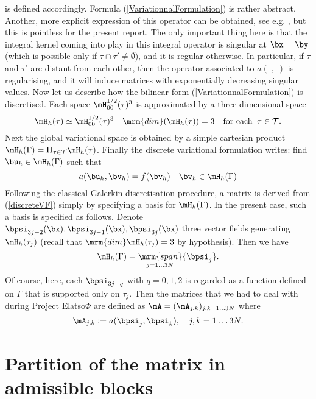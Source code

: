 is defined accordingly. Formula  (\ref{VariationnalFormulation}) is rather abstract. Another, more explicit expression of this operator can be obtained, 
see e.g. \cite{??}, but this is pointless for the present report. The only important thing here is that the integral kernel coming into play in this integral 
operator is singular at $\bx = \by$ (which is possible only if $\tau\cap \tau'\neq \emptyset$), and it is regular otherwise. In particular, if $\tau$ and $\tau'$
are distant from each other, then the operator associated to $a(\;,\;)$ is regularising, and it will induce matrices with exponentially decreasing singular values.
Now let us describe how the bilinear form (\ref{VariationnalFormulation}) is discretised. Each space $\mH^{1/2}_{00}(\tau)^{3}$ is approximated by a three dimensional 
space 
$$
\mH_{h}(\tau)\simeq \mH^{1/2}_{00}(\tau)^{3}\quad \mrm{dim}(\mH_{h}(\tau)) = 3\quad \textrm{for each}\;\;\tau\in \mathcal{T}.
$$ 
Next the global variational space is obtained by a simple cartesian product $\mH_{h}(\Gamma) = \Pi_{\tau\in \mathcal{T}}\mH_{h}(\tau)$.
Finally the discrete variational formulation writes: find $\bu_{h}\in \mH_{h}(\Gamma)$ such that 
\begin{equation}\label{discreteVF}
a(\bu_{h},\bv_{h}) = f(\bv_{h})\quad \bv_{h}\in \mH_{h}(\Gamma)
\end{equation}
Following the classical Galerkin discretisation procedure, a matrix is derived from (\ref{discreteVF}) simply by specifying a basis for 
$\mH_{h}(\Gamma)$. In the present case, such a basis is specified as follows. Denote $\bpsi_{3j-2}(\bx), \bpsi_{3j-1}(\bx),\bpsi_{3j}(\bx)$ 
three vector fields  generating $\mH_{h}(\tau_{j})$ (recall that $\mrm{dim}\mH_{h}(\tau_{j}) = 3$ by hypothesis). Then we have 
$$
\mH_{h}(\Gamma) = \mathop{\mrm{span}}_{j=1\dots 3N}\{\bpsi_{j}\}.
$$
Of course, here, each $\bpsi_{3j-q}$ with $q=0,1,2$ is regarded as a function defined on $\Gamma$ that is supported 
only on $\tau_{j}$. Then the matrices that we had to deal with during Project Elatso$\Phi$ are defined as 
$\mA = (\mA_{j,k})_{j,k=1\dots 3N}$ where 
\begin{equation}\label{GalerkinMatrix}
\mA_{j,k}:=a(\bpsi_{j},\bpsi_{k}),\quad j,k = 1\dots 3N.
\end{equation}

\section{Partition of the matrix in admissible blocks}

